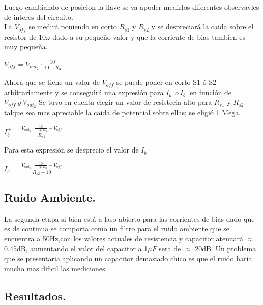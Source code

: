 \documentclass[a4paper]{article}
\begin{document}
Luego cambiando de posicion la llave se va apoder medirlos diferentes observavles de interes del circuito.\\
La $V_{off}$ se medirá poniendo en corto $R_{s1}$ y $R_{s2}$ y se despreciará la caida sobre el resistor de 10$\omega$ dado a su pequeño valor y que la corriente de bias tambien es muy pequeña.\\
\begin{center}$V_{off}=V_{out_2} \cdot \frac{10}{10+R_3} $\end{center}
Ahora que se tiene un valor de $V_{off}$ se  puede poner en corto S1 ó S2 arbitrariamente y se conseguirá una expresión para $ I_b^+ \ o \  I_b^-$ en función de $V_{off} \ y \ V_{out_2}$
Se tuvo en cuenta elegir un valor de resistecia alto para $R_{s1}$ y $R_{s2}$ talque sea mas apreciable la caida de potencial sobre ellas; se eligió 1 Mega.\\
\begin{center}$I_b^+=\frac{V_{out_2} \cdot \frac{10}{10+R_3}-V_{off}}{R_{s1}}$\end{center}
Para esta expresión se desprecio el valor de $I_b^-$
\begin{center}$I_b^-=\frac{V_{out_2} \cdot \frac{10}{10+R_3}-V_{off}}{R_{s2}+10}$\end{center}

\subsection{Ruido Ambiente.}
La segunda etapa si bien está a laso abierto para las corrientes de bias dado que es de continua se comporta como un filtro para el ruido ambiente que se encuentra a 50Hz,con los valores actuales de resistencia y capacitor atenuará $\approx$ 0.45dB, aumentando el valor del capacitor a 1$\mu F$ sera de  $\approx$ 20dB.
Un problema que se presentaria aplicando un capacitor demasiado chico es que el ruido haría mucho mas dificil las mediciones.
\subsection{Resultados.}
\end{document}
